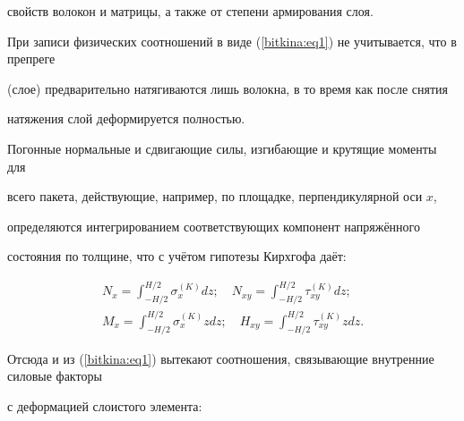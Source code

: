 свойств волокон и матрицы, а также от степени армирования слоя.



При записи физических соотношений в виде (\ref{bitkina:eq1}) не учитывается, что в препреге

(слое) предварительно натягиваются лишь волокна, в то время как после снятия

натяжения слой деформируется полностью.



Погонные нормальные и сдвигающие силы, изгибающие и крутящие моменты для

всего пакета, действующие, например, по площадке, перпендикулярной оси $x$,

определяются интегрированием соответствующих компонент напряжённого

состояния по толщине, что с учётом гипотезы Кирхгофа даёт:

\begin{gather*}

N_x =\int_{-H/2}^{H/2} \sigma_x^{(K)} dz ;  \quad N_{xy} =\int_{-H/2}^{H/2} \tau_{xy}^{(K)} dz ;\\

M_x =\int_{-H/2}^{H/2} \sigma _x^{(K)} zdz; \quad  H_{xy} =\int_{-H/2}^{H/2} \tau _{xy}^{(K)} zdz.

\end{gather*}



Отсюда и из (\ref{bitkina:eq1}) вытекают соотношения, связывающие внутренние силовые факторы

с деформацией слоистого элемента:

